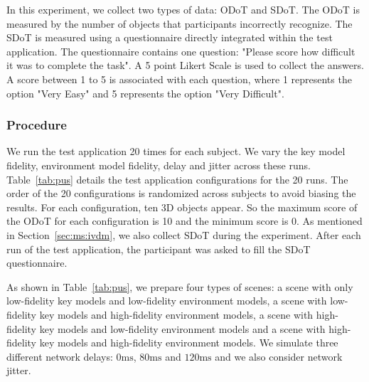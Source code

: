 In this experiment, we collect two types of data: ODoT and SDoT.
The ODoT is measured by the number of objects that participants incorrectly recognize.
The SDoT is measured using a questionnaire directly integrated within the test application. The questionnaire contains one question: "Please score how difficult it was to complete the task". A 5 point Likert Scale is used to collect the answers. A score between 1 to 5 is associated with each question, where 1 represents the option "Very Easy" and 5 represents the option "Very Difficult".

\subsubsection{Procedure}

We run the test application 20 times for each subject. We vary the key model fidelity, environment model fidelity, delay and jitter across these runs. Table~\ref{tab:pus} details the test application configurations for the 20 runs. The order of the 20 configurations is randomized across subjects to avoid biasing the results.
For each configuration, ten 3D objects appear. So the maximum score of the ODoT for each configuration is 10 and the minimum score is 0.
As mentioned in Section~\ref{sec:ms:ivdm}, we also collect SDoT during the experiment. After each run of the test application, the participant was asked to fill the SDoT questionnaire.

As shown in Table~\ref{tab:pus}, we prepare four types of scenes: a scene with only low-fidelity key models and low-fidelity environment models, a scene with low-fidelity key models and high-fidelity environment models, a scene with high-fidelity key models and low-fidelity environment models and a scene with high-fidelity key models and high-fidelity environment models. We simulate three different network delays: $0\mathrm{ms}$, $80\mathrm{ms}$ and $120\mathrm{ms}$ and we also consider network jitter.

